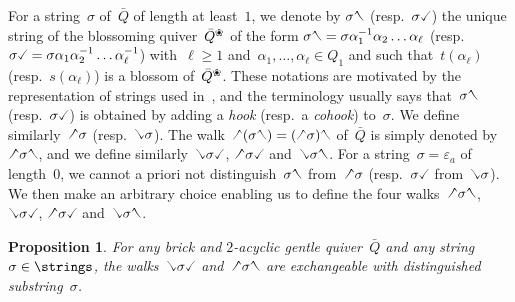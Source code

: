 \documentclass{amsart}
\newtheorem{proposition}[theorem]{Proposition}
\theoremstyle{definition}
\newcommand{\darkblue}{\color{darkblue}} %
\newcommand{\defn}[1]{\textsl{\darkblue #1}} %
\newcommand{\quiver}{\bar Q} %
\newcommand{\blossom}{^\text{\ding{96}}} %
\newcommand{\hL}{\text{\rotatebox[origin=c]{180}{\checked}}}
\newcommand{\hR}{\text{\rotatebox[origin=c]{180}{\reflectbox{\checked}}}}
\newcommand{\cL}{\text{\reflectbox{\checked}}}
\newcommand{\cR}{\text{\checked}}
\newcommand{\hh}[1]{\hL#1\hR} %
\newcommand{\cc}[1]{\cL#1\cR} %
\newcommand{\hc}[1]{\hL#1\cR} %
\newcommand{\ch}[1]{\cL#1\hR} %
\begin{document}
For a string~$\sigma$ of~$\quiver$ of length at least~$1$, we denote by $\sigma\hR$ (resp.~$\sigma\cR$) the unique string of the blossoming quiver~$\quiver\blossom$ of the form $\sigma\hR = \sigma \alpha_1^{-1} \alpha_2 \dots \alpha_\ell$ (resp.~$\sigma\cR = \sigma \alpha_1 \alpha_2^{-1} \dots \alpha_\ell^{-1}$) with~$\ell \ge 1$ and~${\alpha_1, \dots, \alpha_\ell \in Q_1}$ and such that~$t(\alpha_\ell)$ (resp.~$s(\alpha_\ell)$) is a blossom of~$\quiver\blossom$.
These notations are motivated by the representation of strings used in~\cite{ButlerRingel, PaluPilaudPlamondon-nonkissing}, and the terminology usually says that~$\sigma\hR$ (resp.~$\sigma\cR$) is obtained by adding a \defn{hook} (resp.~a \defn{cohook}) to~$\sigma$.
We define similarly~$\hL\sigma$ (resp.~$\cL\sigma$).
The walk~$\hL(\sigma\hR) = (\hL\sigma)\hR$ of~$\quiver$ is simply denoted by~$\hh{\sigma}$, and we define similarly~$\cc{\sigma}$, $\hc{\sigma}$ and~$\ch{\sigma}$.
For a string~$\sigma = \varepsilon_a$ of length~$0$, we cannot a priori not distinguish~$\sigma\hR$ from~$\hL\sigma$ (resp.~$\sigma\cR$ from~$\cL\sigma$).
We then make an arbitrary choice enabling us to define the four walks~$\hh{\sigma}$, $\cc{\sigma}$, $\hc{\sigma}$ and~$\ch{\sigma}$.

\begin{proposition}
\label{prop:interestingExchangeablePairsNKC}
For any brick and $2$-acyclic gentle quiver~$\quiver$ and any string~$\sigma \in \strings$, the walks~$\cc{\sigma}$ and~$\hh{\sigma}$ are exchangeable with distinguished substring~$\sigma$.
\end{proposition}
\end{document}
